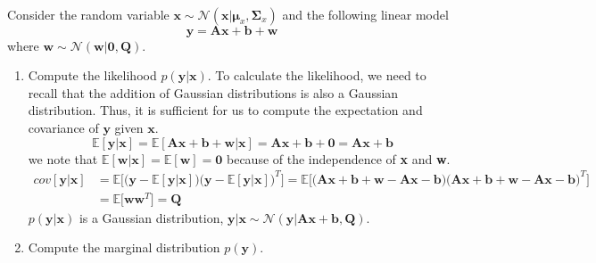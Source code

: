 \paragraph{} Consider the random variable $\textbf{x} \sim \mathcal{N}(\textbf{x}|\bm{\mu}_x, \bm{\Sigma}_x)$ and the following linear model
\[
\textbf{y} = \textbf{A}\textbf{x} + \textbf{b} + \textbf{w}
\]
where $\textbf{w} \sim \mathcal{N}(\textbf{w}|\textbf{0}, \textbf{Q})$.
\begin{enumerate}
\item Compute the likelihood $p(\textbf{y}|\textbf{x})$.
To calculate the likelihood, we need to recall that the addition of Gaussian distributions is also a Gaussian distribution. Thus, it is sufficient for us to compute the expectation and covariance of $\textbf{y}$ given $\textbf{x}$.
\[
\mathbb{E}[\textbf{y}|\textbf{x}] = \mathbb{E}[\textbf{A}\textbf{x} +\textbf{b} + \textbf{w}| \textbf{x}] = \textbf{A}\textbf{x} + \textbf{b} + \textbf{0} = \textbf{A}\textbf{x} + \textbf{b}
\]
we note that $\mathbb{E}[\textbf{w}|\textbf{x}] = \mathbb{E}[\textbf{w}] = \textbf{0}$ because of the independence of \textbf{x} and \textbf{w}.
\begin{align*}
cov[\textbf{y}|\textbf{x}] &= \mathbb{E}\Big[\big(\textbf{y} - \mathbb{E}[\textbf{y}|\textbf{x}]\big)\big(\textbf{y} - \mathbb{E}[\textbf{y}|\textbf{x}]\big)^T\Big] = \mathbb{E}\Big[\big(\textbf{A}\textbf{x} + \textbf{b} + \textbf{w} - \textbf{A}\textbf{x} - \textbf{b}\big)\big(\textbf{A}\textbf{x} + \textbf{b} + \textbf{w} - \textbf{A}\textbf{x} - \textbf{b}\big)^T\Big]\\
&=\mathbb{E}\Big[\textbf{w}\textbf{w}^T\Big] = \textbf{Q}
\end{align*}
$p(\textbf{y}|\textbf{x})$ is a Gaussian distribution, $\textbf{y}|\textbf{x} \sim \mathcal{N}(\textbf{y}| \textbf{A}\textbf{x} + \textbf{b}, \textbf{Q})$.
\item Compute the marginal distribution $p(\textbf{y})$.


\end{enumerate}
